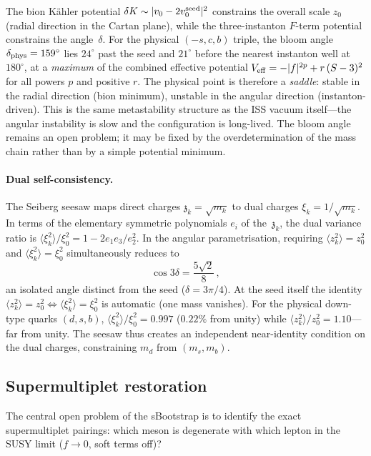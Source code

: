 \documentclass[12pt,a4paper]{article}
\newcommand{\zch}{\mathfrak{z}}
\begin{document}
The bion K\"ahler potential $\delta K \sim |v_0 - 2v_0^{\rm seed}|^2$
constrains the overall scale $z_0$ (radial direction in the
Cartan plane), while the three-instanton $F$-term potential constrains
the angle~$\delta$.
For the physical $(-s,c,b)$ triple, the bloom angle
$\delta_{\rm phys} = 159^\circ$
lies $24^\circ$ past the seed and $21^\circ$ before the nearest
instanton well at $180^\circ$, at a \emph{maximum} of the
combined effective potential
$V_{\rm eff} = -|f|^{2p} + r\,(S-3)^2$
for all powers $p$ and positive $r$.
The physical point is therefore a \emph{saddle}:
stable in the radial direction (bion minimum), unstable in the
angular direction (instanton-driven).
This is the same metastability structure as the ISS vacuum itself---the
angular instability is slow and the configuration is long-lived.
The bloom angle remains an open problem;
it may be fixed by the overdetermination of the mass chain
rather than by a simple potential minimum.

\paragraph{Dual self-consistency.}
The Seiberg seesaw maps direct charges $\zch_k = \sqrt{m_k}$
to dual charges $\xi_k = 1/\sqrt{m_k}$. In terms of the
elementary symmetric polynomials $e_i$ of the~$\zch_k$,
the dual variance ratio is
$\langle\xi_k^2\rangle/\xi_0^2 = 1 - 2e_1 e_3/e_2^2$.
In the angular parametrisation, requiring
$\langle z_k^2\rangle = z_0^2$ and
$\langle\xi_k^2\rangle = \xi_0^2$ simultaneously reduces to
\begin{equation}
  \cos 3\delta = \frac{5\sqrt{2}}{8}\,,
\end{equation}
an isolated angle distinct from the seed ($\delta = 3\pi/4$).
At the seed itself the identity
$\langle z_k^2\rangle = z_0^2 \Leftrightarrow
\langle\xi_k^2\rangle = \xi_0^2$ is automatic (one mass vanishes).
For the physical down-type quarks $(d,s,b)$,
$\langle\xi_k^2\rangle/\xi_0^2 = 0.997$ ($0.22\%$ from unity)
while $\langle z_k^2\rangle/z_0^2 = 1.10$---far from unity.
The seesaw thus creates an independent near-identity condition
on the dual charges, constraining $m_d$ from $(m_s, m_b)$.

\subsection{Supermultiplet restoration}

The central open problem of the sBootstrap is to identify the
exact supermultiplet pairings: which meson is degenerate with
which lepton in the SUSY limit ($f \to 0$, soft terms off)?
\end{document}
